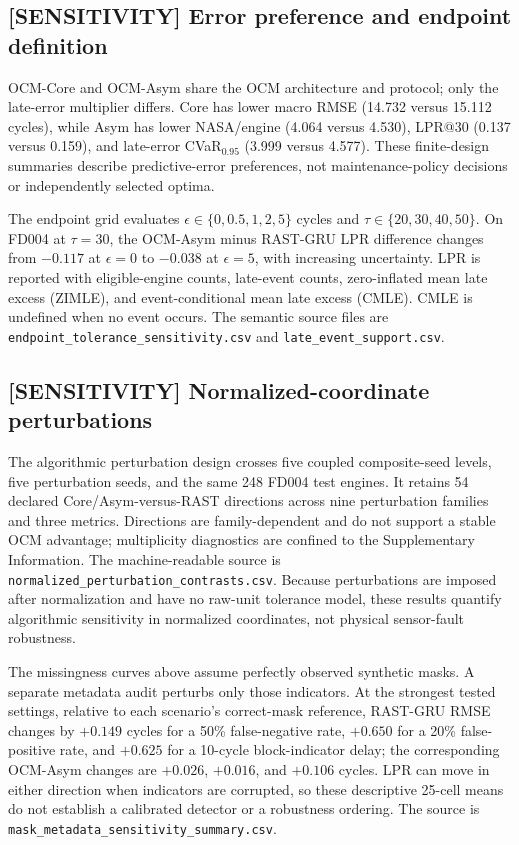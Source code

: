 \subsection{[SENSITIVITY] Error preference and endpoint definition}

OCM-Core and OCM-Asym share the OCM architecture and protocol; only the late-error multiplier differs. Core has lower macro RMSE (14.732 versus 15.112 cycles), while Asym has lower NASA/engine (4.064 versus 4.530), LPR@30 (0.137 versus 0.159), and late-error CVaR$_{0.95}$ (3.999 versus 4.577). These finite-design summaries describe predictive-error preferences, not maintenance-policy decisions or independently selected optima.




The endpoint grid evaluates $\epsilon\in\{0,0.5,1,2,5\}$ cycles and $\tau\in\{20,30,40,50\}$. On FD004 at $\tau=30$, the OCM-Asym minus RAST-GRU LPR difference changes from $-0.117$ at $\epsilon=0$ to $-0.038$ at $\epsilon=5$, with increasing uncertainty. LPR is reported with eligible-engine counts, late-event counts, zero-inflated mean late excess (ZIMLE), and event-conditional mean late excess (CMLE). CMLE is undefined when no event occurs. The semantic source files are \texttt{endpoint\_tolerance\_sensitivity.csv} and \texttt{late\_event\_support.csv}.

\subsection{[SENSITIVITY] Normalized-coordinate perturbations}

The algorithmic perturbation design crosses five coupled composite-seed levels, five perturbation seeds, and the same 248 FD004 test engines. It retains 54 declared Core/Asym-versus-RAST directions across nine perturbation families and three metrics. Directions are family-dependent and do not support a stable OCM advantage; multiplicity diagnostics are confined to the Supplementary Information. The machine-readable source is \texttt{normalized\_perturbation\_contrasts.csv}. Because perturbations are imposed after normalization and have no raw-unit tolerance model, these results quantify algorithmic sensitivity in normalized coordinates, not physical sensor-fault robustness.

The missingness curves above assume perfectly observed synthetic masks. A separate metadata audit perturbs only those indicators. At the strongest tested settings, relative to each scenario's correct-mask reference, RAST-GRU RMSE changes by $+0.149$ cycles for a 50\% false-negative rate, $+0.650$ for a 20\% false-positive rate, and $+0.625$ for a 10-cycle block-indicator delay; the corresponding OCM-Asym changes are $+0.026$, $+0.016$, and $+0.106$ cycles. LPR can move in either direction when indicators are corrupted, so these descriptive 25-cell means do not establish a calibrated detector or a robustness ordering. The source is \texttt{mask\_metadata\_sensitivity\_summary.csv}.


